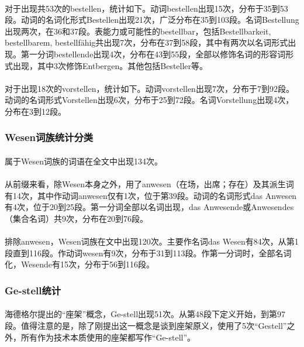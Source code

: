 \documentclass{article}
\begin{document}
			\paragraph{}	
对于出现共53次的bestellen，统计如下。动词bestellen出现15次，分布于35到53段。动词的名词化形式Bestellen出现21次，广泛分布在35到103段。名词Bestellung出现两次，在36和37段。表能力或可能性的bestellbar，包括Bestellbarkeit, bestellbarem, bestellfähig共出现7次，分布在37到58段，其中有两次以名词形式出现。第一分词bestellende出现4次，分布在43到55段，全部以修饰名词的形容词形式出现，其中3次修饰Entbergen。其他包括Besteller等。
			\paragraph{}	
对于出现18次的vorstellen，统计如下。动词vorstellen出现7次，分布于7到92段。动词的名词形式Vorstellen出现6次，分布于25到72段。名词Vorstellung出现4次，分布在3到12段。			
		\subsubsection{Wesen词族统计分类}
			\paragraph{}
			属于Wesen词族的词语在全文中出现134次。
			\paragraph{}
			从前缀来看，除Wesen本身之外，用了anwesen（在场，出席；存在）及其派生词有14次，其中作动词anwesen仅有1次，位于第39段。动词的名词形式das Anwesen有4次，位于20到25段。第一分词全部以名词出现，das Anwesende或Anwesendes（集合名词）共9次，分布在20到76段。
			\paragraph{}
排除anwesen，Wesen词族在文中出现120次。主要作名词das Wesen有84次，从第1段直到116段。作动词wesen有9次，分布于31到113段。作第一分词时，全部名词化，Wesende有15次，分布于56到116段。
		\subsubsection{Ge-stell统计}
			\paragraph{}
			海德格尔提出的“座架”概念，Ge-stell出现51次。从第48段下定义开始，到第97段。值得注意的是，除了刚提出这一概念是谈到座架原义，使用了5次“Gestell”之外，所有作为技术本质使用的座架都写作“Ge-stell”。
\end{document}
